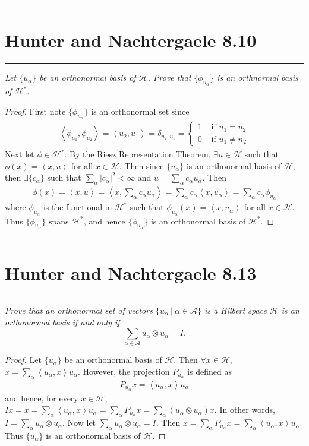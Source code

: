 \documentclass{article} %
\theoremstyle{plain}
\newcommand{\VEC}[2]{\left\langle #1, #2 \right\rangle}
\newcommand{\Hilb}{\mathcal{H}}
\newcommand{\problem}[1]{
\vspace{.375cm}
\begin{minipage}{\textwidth}
    \begin{center}
        \noindent\rule{5cm}{1pt}
    \end{center}
    \section{\bf #1}
    \begin{center}
        \noindent\rule{5cm}{1pt}
    \end{center}
    \vspace{0.25cm}
\end{minipage}
}
\numberwithin{equation}{section} %
\numberwithin{figure}{section} %
\numberwithin{table}{section} %
\begin{document}
\problem{Hunter and Nachtergaele 8.10}
\emph{Let $\{u_\alpha\}$ be an orthonormal basis of $\Hilb$.  Prove that $\{\phi_{u_\alpha}\}$ is an orthnormal basis of $\Hilb^*$.}

\begin{proof}
    First note $\{\phi_{u_\alpha}\}$ is an orthonormal set since
    \begin{align*}
        \VEC{\phi_{u_1}}{\phi_{u_2}} = \VEC{u_2}{u_1} = \delta_{u_2,u_1} = \begin{cases}
            1 & \text{ if } u_1 = u_2 \\
            0 & \text{ if } u_1 \neq n_2
        \end{cases}
    \end{align*}
    Next let $\phi \in \Hilb^*$.  By the Riesz Representation Theorem, $\exists u \in \Hilb$ such that $\phi(x) = \VEC{x}{u}$ for all $x \in \Hilb$.  Then since $\{u_\alpha\}$ is an orthonormal basis of $\Hilb$, then $\exists \{c_\alpha\}$ such that $\sum_{\alpha}|c_\alpha|^2 < \infty$ and $u = \sum_{\alpha}c_\alpha u_\alpha$.  Then
    \begin{align*}
        \phi(x) = \VEC{x}{u} = \VEC{x}{\sum_\alpha c_\alpha u_\alpha} = \sum_\alpha c_\alpha\VEC{x}{u_\alpha} = \sum_\alpha c_\alpha \phi_{u_\alpha}
    \end{align*}
    where $\phi_{u_\alpha}$ is the functional in $\Hilb^*$ such that $\phi_{u_\alpha}(x) = \VEC{x}{u_\alpha}$ for all $x \in \Hilb$.  Thus $\{\phi_{u_\alpha}\}$ spans $\Hilb^*$, and hence $\{\phi_{u_\alpha}\}$ is an orthonormal basis of $\Hilb^*$.
\end{proof}







\problem{Hunter and Nachtergaele 8.13}
\emph{Prove that an orthonormal set of vectors $\{u_\alpha\ |\ \alpha \in \mathcal{A}\}$ is a Hilbert space $\Hilb$ is an orthonormal basis if and only if $$\sum_{\alpha \in \mathcal{A}} u_\alpha \otimes u_\alpha = I.$$}

\begin{proof}
    Let $\{u_\alpha\}$ be an orthonormal basis of $\Hilb$.  Then $\forall x \in \Hilb$, $x = \sum_\alpha \VEC{u_\alpha}{x}u_\alpha$.  However, the projection $P_{u_\alpha}$ is defined as
    \begin{align*}
        P_{u_\alpha}x = \VEC{u_\alpha}{x}u_\alpha
    \end{align*}
    and hence, for every $x \in \Hilb$, $I x = x = \sum_\alpha \VEC{u_\alpha}{x}u_\alpha = \sum_\alpha P_{u_\alpha}x = \sum_\alpha (u_\alpha \otimes u_\alpha) x$.  In other words, $I = \sum_\alpha u_\alpha \otimes u_\alpha$.  Now let $\sum_\alpha u_\alpha \otimes u_\alpha = I$.  Then $x = \sum_\alpha P_{u_\alpha}x = \sum_\alpha \VEC{u_\alpha}{x}u_\alpha$.  Thus $\{u_\alpha\}$ is an orthonormal basis of $\Hilb$.
\end{proof}
\end{document}

